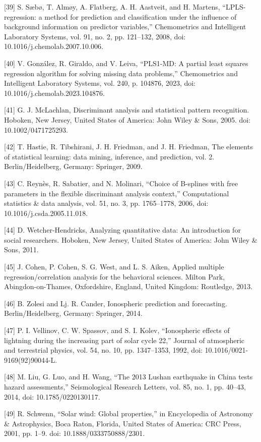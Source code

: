 \let\LaTeXcline\cline\documentclass[sn-mathphys-num]{sn-jnl}\let\cline\LaTeXcline
\begin{document}
[39] S. Sæbø, T. Almøy, A. Flatberg, A. H. Aastveit, and H. Martens, “LPLS-regression: a method for prediction and classification under the influence of background information on predictor variables,” Chemometrics and Intelligent Laboratory Systems, vol. 91, no. 2, pp. 121–132, 2008, doi: 10.1016/j.chemolab.2007.10.006.

[40] V. González, R. Giraldo, and V. Leiva, “PLS1-MD: A partial least squares regression algorithm for solving missing data problems,” Chemometrics and Intelligent Laboratory Systems, vol. 240, p. 104876, 2023, doi: 10.1016/j.chemolab.2023.104876.

[41] G. J. McLachlan, Discriminant analysis and statistical pattern recognition. Hoboken, New Jersey, United States of America: John Wiley & Sons, 2005. doi: 10.1002/0471725293.

[42] T. Hastie, R. Tibshirani, J. H. Friedman, and J. H. Friedman, The elements of statistical learning: data mining, inference, and prediction, vol. 2. Berlin/Heidelberg, Germany: Springer, 2009.

[43] C. Reynès, R. Sabatier, and N. Molinari, “Choice of B-splines with free parameters in the flexible discriminant analysis context,” Computational statistics & data analysis, vol. 51, no. 3, pp. 1765–1778, 2006, doi: 10.1016/j.csda.2005.11.018.

[44] D. Wetcher-Hendricks, Analyzing quantitative data: An introduction for social researchers. Hoboken, New Jersey, United States of America: John Wiley & Sons, 2011.

[45] J. Cohen, P. Cohen, S. G. West, and L. S. Aiken, Applied multiple regression/correlation analysis for the behavioral sciences. Milton Park, Abingdon-on-Thames, Oxfordshire, England, United Kingdom: Routledge, 2013.

[46] B. Zolesi and Lj. R. Cander, Ionospheric prediction and forecasting. Berlin/Heidelberg, Germany: Springer, 2014.

[47] P. I. Vellinov, C. W. Spassov, and S. I. Kolev, “Ionospheric effects of lightning during the increasing part of solar cycle 22,” Journal of atmospheric and terrestrial physics, vol. 54, no. 10, pp. 1347–1353, 1992, doi: 10.1016/0021-9169(92)90044-L.

[48] M. Liu, G. Luo, and H. Wang, “The 2013 Lushan earthquake in China tests hazard assessments,” Seismological Research Letters, vol. 85, no. 1, pp. 40–43, 2014, doi: 10.1785/0220130117.

[49] R. Schwenn, “Solar wind: Global properties,” in Encyclopedia of Astronomy & Astrophysics, Boca Raton, Florida, United States of America: CRC Press, 2001, pp. 1–9. doi: 10.1888/0333750888/2301.
\end{document}
